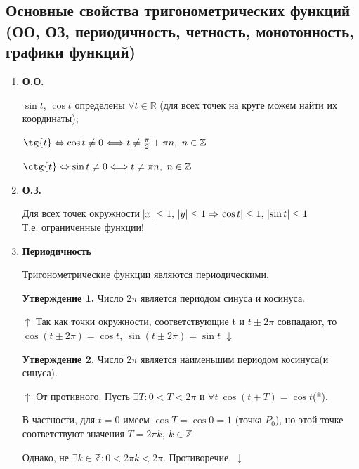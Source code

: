 \documentclass{article}
\begin{document}
      	\subsection{Основные свойства тригонометрических функций (ОО, ОЗ, периодичность, четность, монотонность, графики функций)}
        
        \begin{enumerate}
        	\item \textbf{О.О.} 
          	
            \(\sin{t}\), \(\cos{t}\) определены \(\forall t \in \mathbb{R}\) (для всех точек на круге можем найти их координаты);
            
            \(\tg{t} \Leftrightarrow \cos{t} \not = 0 \Longleftrightarrow t \not = \frac{\pi}{2} + \pi n,\ n \in \mathbb{Z}\)

			\(\ctg{t} \Leftrightarrow \sin{t} \not = 0 \Longleftrightarrow t \not = \pi n,\ n \in \mathbb{Z}\)
            
            \item \textbf{О.З.}
            
            Для всех точек окружности \(\abs{x} \leq 1,\ \abs{y} \leq 1 \Rightarrow \abs{\cos{t}} \leq 1,\ \abs{\sin{t}} \leq 1\)
            \\Т.е. ограниченные функции!
            
            \item \textbf{Периодичность}
            
            Тригонометрические функции являются периодическими.
            
            \textbf{Утверждение 1.} Число \(2 \pi\) является периодом синуса и косинуса.
            
            \(\uparrow\) Так как точки окружности, соответствующие t и \(t \pm 2 \pi\) совпадают, то \(\cos{(t \pm 2 \pi)} = \cos{t}\), \(\sin{(t \pm 2 \pi)} = \sin{t}\) \(\downarrow\)
        
            \textbf{Утверждение 2.} Число \(2 \pi\) является наименьшим периодом косинуса(и синуса).
            
            \(\uparrow\) От противного. Пусть \(\exists T: 0 < T < 2 \pi\) и \(\forall t \ \cos{(t+T)} = \cos{t}\)(*).
            
            В частности, для \(t=0\) имеем \(\cos{T} = \cos{0} = 1\) (точка \(P_0\)), но этой точке соответствуют значения \(T = 2 \pi k, \ k \in \mathbb{Z}\)
            
            Однако, не \(\exists k \in \mathbb{Z}: 0 < 2 \pi k < 2 \pi\). Противоречие. \(\downarrow\)
            

\end{enumerate}
\end{document}
